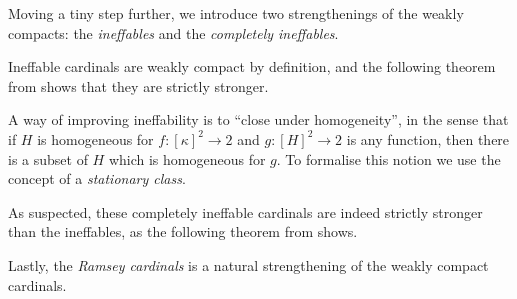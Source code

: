 \documentclass[../../main]{subfiles}
\begin{document}
Moving a tiny step further, we introduce two strengthenings of the weakly compacts: the \textit{ineffables} and the \textit{completely ineffables}.


Ineffable cardinals are weakly compact by definition, and the following theorem from \cite{Friedman} shows that they are strictly stronger.


A way of improving ineffability is to ``close under homogeneity'', in the sense that if $H$ is homogeneous for $f\colon[\kappa]^2\to 2$ and $g\colon[H]^2\to 2$ is any function, then there is a subset of $H$ which is homogeneous for $g$. To formalise this notion we use the concept of a \textit{stationary class}.



As suspected, these completely ineffable cardinals are indeed strictly stronger than the ineffables, as the following theorem from \cite{Abramson} shows.


Lastly, the \textit{Ramsey cardinals} is a natural strengthening of the weakly compact cardinals.

\end{document}
